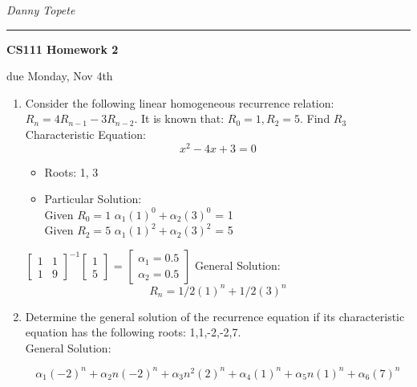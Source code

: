 \documentclass[11pt]{article}
\newcommand{\student}[1]{{\noindent\Large\em {#1} \hfill}\vskip 0.1in}
\newcommand{\assignment}[1]{\centerline{\large\bf CS111 Homework {#1}}}
\newcommand{\duedate}[1]{{\centerline{due {#1}}}}
\newcounter{prnum}
\newenvironment{problem}{{\vskip 0.2in\noindent\bf Problem
       \addtocounter{prnum}{1} \arabic{prnum}.}}{\vskip 0.1in}
\begin{document}
\student{Danny Topete} %
\vskip 0.1in\noindent\hrule\vskip 0.2in
\assignment{2}                           %
\duedate{Monday, Nov 4th}              %


\begin{problem}
\begin{enumerate}[label=\alph*)]
    \item Consider the following linear homogeneous recurrence relation: $R_n = 4R_{n-1} - 3R_{n-2}.$
      It is known that: $R_0 = 1, R_2 = 5$. Find $R_3$
      Characteristic Equation: 
      \begin{equation}
        x^2 - 4x + 3 = 0
      \end{equation}
      \begin{itemize}
        \item Roots: 1, 3
        \item Particular Solution: \\
         Given $R_0 = 1$ \Rightarrow $\alpha_1(1)^0 + \alpha_2(3)^0$ = 1\\
         Given $R_2 = 5$ \Rightarrow $\alpha_1(1)^2 + \alpha_2(3)^2$ = 5


      \end{itemize}

        $\begin{bmatrix} 1 & 1 \\ 1 & 9 \end{bmatrix}^{-1} \begin{bmatrix} 1 \\ 5 \end{bmatrix}$ = 
        $\begin{bmatrix} \alpha_1 = 0.5\\ \alpha_2 = 0.5 \end{bmatrix}$
      General Solution: 
      \begin{equation}
        R_n = 1/2 (1)^n + 1/2 (3)^n
      \end{equation}

    \item Determine the general solution of the recurrence equation if its characteristic
      equation has the following roots: 1,1,-2,-2,7.\\


        General Solution: 

      \begin{equation}
        \alpha_1(-2)^n+\alpha_2n(-2)^n+\alpha_3n^2(2)^n+\alpha_4(1)^n+\alpha_5n(1)^n+\alpha_6(7)^n
      \end{equation}


\end{enumerate}
\end{problem}
\end{document}
